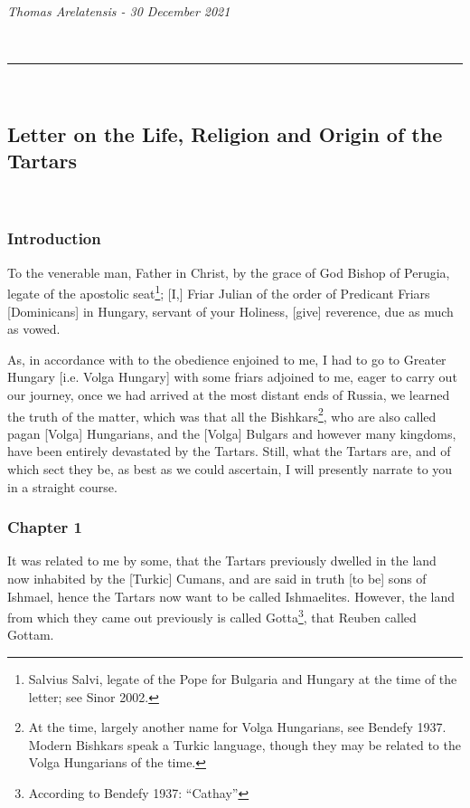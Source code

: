 {\ }

\emph{Thomas Arelatensis - 30 December 2021}

{\ }

\rule{\textwidth}[   %

{\ }

\subsection{Letter on the Life, Religion and Origin of the Tartars}

{\ }


\subsubsection{Introduction}

To the venerable man, Father in Christ, by the grace of God Bishop of Perugia, legate of the apostolic seat\footnote{Salvius Salvi, legate of the Pope for Bulgaria and Hungary at the time of the letter; see Sinor 2002.}; [I,] Friar Julian of the order of Predicant Friars [Dominicans] in Hungary, servant of your Holiness, [give] reverence, due as much as vowed.

As, in accordance with to the obedience enjoined to me, I had to go to Greater Hungary [i.e. Volga Hungary] with some friars adjoined to me, eager to carry out our journey, once we had arrived at the most distant ends of Russia, we learned the truth of the matter, which was that all the Bishkars\footnote{At the time, largely another name for Volga Hungarians, see Bendefy 1937. Modern Bishkars speak a Turkic language, though they may be related to the Volga Hungarians of the time.}, who are also called pagan [Volga] Hungarians, and the [Volga] Bulgars and however many kingdoms, have been entirely devastated by the Tartars. Still, what the Tartars are, and of which sect they be, as best as we could ascertain, I will presently narrate to you in a straight course.



\subsubsection{Chapter 1}


It was related to me by some, that the Tartars previously dwelled in the land now inhabited by the [Turkic] Cumans, and are said in truth [to be] sons of Ishmael, hence the Tartars now want to be called Ishmaelites. However, the land from which they came out previously is called Gotta\footnote{According to Bendefy 1937: ``Cathay''}, that Reuben called Gottam. 

